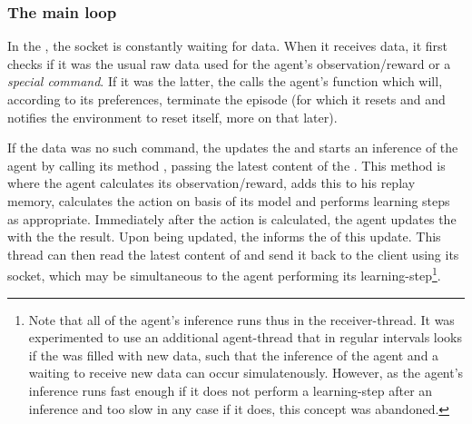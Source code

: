 \subsubsection{The main loop}

In the , the socket is constantly waiting for data. When it receives data, it first checks if it was the usual raw data used for the agent's observation/reward or a \textit{special command}. If it was the latter, the  calls the agent's function  which will, according to its preferences, terminate the episode (for which it resets  and  and notifies the environment to reset itself, more on that later). 

If the data was no such command, the  updates the  and starts an inference of the agent by calling its method , passing the latest content of the . This method is where the agent calculates its observation/reward, adds this to his replay memory, calculates the action on basis of its model and performs learning steps as appropriate. Immediately after the action is calculated, the agent updates the  with the the result. Upon being updated, the  informs the  of this update. This thread can then read the latest content of  and send it back to the client using its socket, which may be simultaneous to the agent performing its learning-step\footnote{Note that all of the agent's inference runs thus in the receiver-thread. It was experimented to use an additional agent-thread that in regular intervals looks if the  was filled with new data, such that the inference of the agent and a waiting to receive new data can occur simulatenously. However, as the agent's inference runs fast enough if it does not perform a learning-step after an inference and too slow in any case if it does, this concept was abandoned.}. 

